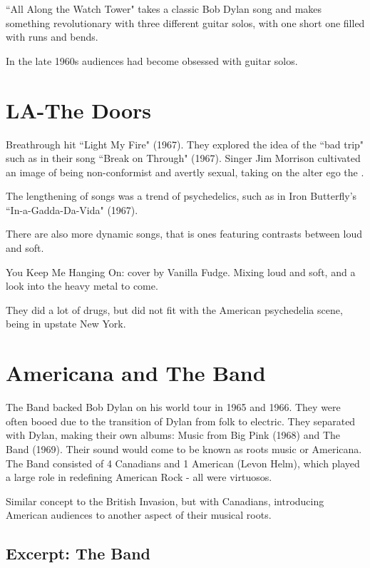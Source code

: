 \documentclass[12pt, a4paper, twoside, openright, titlepage]{book}
\begin{document}
``All Along the Watch Tower" takes a classic Bob Dylan song and makes something revolutionary with three different guitar solos, with one short one filled with runs and bends. 


In the late 1960s audiences had become obsessed with guitar solos.


\section{LA-The Doors}

Breathrough hit ``Light My Fire" (1967). They explored the idea of the ``bad trip" such as in their song ``Break on Through" (1967). Singer Jim Morrison cultivated an image of being non-conformist and avertly sexual, taking on the alter ego the .

The lengthening of songs was a trend of psychedelics, such as in Iron Butterfly's ``In-a-Gadda-Da-Vida" (1967).

There are also more dynamic songs, that is ones featuring contrasts between loud and soft.

\begin{eg}{}{}
    You Keep Me Hanging On: cover by Vanilla Fudge. Mixing loud and soft, and a look into the heavy metal to come.

    They did a lot of drugs, but did not fit with the American psychedelia scene, being in upstate New York.
\end{eg}


\section{Americana and The Band}

The Band backed Bob Dylan on his world tour in 1965 and 1966. They were often booed due to the transition of Dylan from folk to electric. They separated with Dylan, making their own albums: Music from Big Pink (1968) and The Band (1969). Their sound would come to be known as roots music or Americana. The Band consisted of 4 Canadians and 1 American (Levon Helm), which played a large role in redefining American Rock - all were virtuosos. 

Similar concept to the British Invasion, but with Canadians, introducing American audiences to another aspect of their musical roots.

\subsection{Excerpt: The Band}
\end{document}
